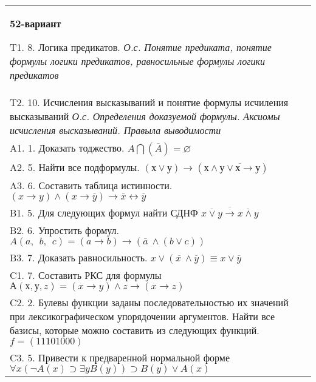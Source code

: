 \documentclass{article}
\begin{document}
\begin{tabular}{m{17cm}}
\textbf{52-вариант}
\newline

T1. 8. Логика предикатов. \emph{О.с. Понятие предиката, понятие формулы логики предикатов, равносильные формулы логики предикатов} \\
T2. 10. Исчисления высказываний и понятие формулы исчиления высказываний \emph{О.с. Определения доказуемой формулы. Аксиомы исчисления высказываний. Правыла выводимости} \\
A1. 1. Доказать тоджество. \(A\bigcap(\overline{A}) = \varnothing\) \\
A2. 5. Найти все подформулы. \((х \vee у) \rightarrow \left( х \land \overline{у \vee х \rightarrow у} \right)\) \\
A3. 6. Составить таблица истинности. \((x \rightarrow y) \land (x \rightarrow \overline{y}) \rightarrow \overline{x} \leftrightarrow \overline{y}\) \\
B1. 5. Для следующих формул найти СДНФ \(\overline{\overline{x \vee y} \rightarrow \overline{x \land y}}\) \\
B2. 6. Упростить формул. \(A(a,\ \ b,\ \ c) = (a \rightarrow b) \rightarrow (\overline{a}\  \land (b \vee c))\) \\
B3. 7. Доказать равносильность. \(x \vee \left( \overline{x\ } \land \overline{y} \right) \equiv x \vee \overline{y}\) \\
C1. 7. Составить РКС для формулы \(А(х,у,z) = (x \rightarrow y) \land z \rightarrow (x \rightarrow z)\) \\
C2. 2. Булевы функции заданы последовательностью их значений при лексикографическом упорядочении аргументов. Найти все базисы, которые можно составить из следующих функций. \(f = (11101000)\) \\
C3. 5. Привести к предваренной нормальной форме \(\forall x(\neg A(x) \supset \exists yB(y)) \supset B(y) \vee A(x)\) \\

\end{tabular}
\vspace{1cm}
\end{document}
